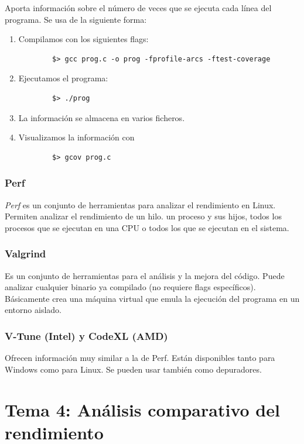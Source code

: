 \documentclass[12pt,spanish]{article}
\begin{document}
Aporta información sobre el número de veces que se ejecuta cada línea del programa. Se usa de la siguiente forma:

\begin{enumerate}
	\item Compilamos con los siguientes flags:
	\begin{lstlisting}
		$> gcc prog.c -o prog -fprofile-arcs -ftest-coverage
	\end{lstlisting}
	\item Ejecutamos el programa:
	\begin{lstlisting}
		$> ./prog
	\end{lstlisting}
	\item La información se almacena en varios ficheros.
	\item Visualizamos la información con
	\begin{lstlisting}
		$> gcov prog.c
	\end{lstlisting}
\end{enumerate}

\subsubsection{Perf}

\textit{Perf} es un conjunto de herramientas para analizar el rendimiento en Linux. Permiten analizar el rendimiento de un hilo. un proceso y sus hijos, todos los procesos que se ejecutan en una CPU o todos los que se ejecutan en el sistema.

\subsubsection{Valgrind}

Es un conjunto de herramientas para el análisis y la mejora del código. Puede analizar cualquier binario ya compilado (no requiere flags específicos). Básicamente crea una máquina virtual que emula la ejecución del programa en un entorno aislado.

\subsubsection{V-Tune (Intel) y CodeXL (AMD)}

Ofrecen información muy similar a la de Perf. Están disponibles tanto para Windows como para Linux. Se pueden usar también como depuradores.
\newpage
\section{Tema 4: Análisis comparativo del rendimiento}
\end{document}
